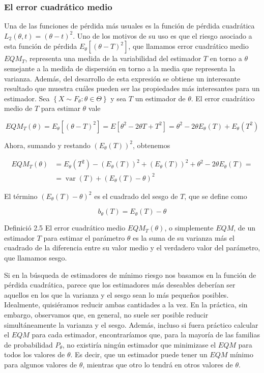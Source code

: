 \documentclass[
]{article}
\begin{document}
\subsubsection{El error cuadrático medio}\label{el-error-cuadruxe1tico-medio}

Una de las funciones de pérdida más usuales es la función de pérdida cuadrática \(L_{2}(\theta, t)=(\theta-t)^{2}\). Uno de los motivos de su uso es que el riesgo asociado a esta función de pérdida \(E_{\theta}\left[(\theta-T)^{2}\right]\), que llamamos error cuadrático medio \(E Q M_{T}\), representa una medida de la variabilidad del estimador \(T\) en torno a \(\theta\) semejante a la medida de dispersión en torno a la media que representa la varianza.
Además, del desarrollo de esta expresión se obtiene un interesante resultado que muestra cuáles pueden ser las propiedades más interesantes para un estimador.
Sea \(\left\{X \sim F_{\theta}: \theta \in \Theta\right\}\) y sea \(T\) un estimador de \(\theta\). El error cuadrático medio de \(T\) para estimar \(\theta\) vale

\[
E Q M_{T}(\theta)=E_{\theta}\left[(\theta-T)^{2}\right]=E\left[\theta^{2}-2 \theta T+T^{2}\right]=\theta^{2}-2 \theta E_{\theta}(T)+E_{\theta}\left(T^{2}\right)
\]

Ahora, sumando y restando \(\left(E_{\theta}(T)\right)^{2}\), obtenemos

\[
\begin{aligned}
E Q M_{T}(\theta) & =E_{\theta}\left(T^{2}\right)-\left(E_{\theta}(T)\right)^{2}+\left(E_{\theta}(T)\right)^{2}+\theta^{2}-2 \theta E_{\theta}(T)= \\
& =\operatorname{var}(T)+\left(E_{\theta}(T)-\theta\right)^{2}
\end{aligned}
\]

El término \(\left(E_{\theta}(T)-\theta\right)^{2}\) es el cuadrado del sesgo de \(T\), que se define como

\[
b_{\theta}(T)=E_{\theta}(T)-\theta
\]

Definició 2.5 El error cuadrático medio \(E Q M_{T}(\theta)\), o simplemente \(E Q M\), de un estimador \(T\) para estimar el parámetro \(\theta\) es la suma de su varianza más el cuadrado de la diferencia entre su valor medio y el verdadero valor del parámetro, que llamamos sesgo.

Si en la búsqueda de estimadores de mínimo riesgo nos basamos en la función de pérdida cuadrática, parece que los estimadores más deseables deberían ser aquellos en los que la varianza y el sesgo sean lo más pequeños posibles. Idealmente, quisiéramos reducir ambas cantidades a la vez. En la práctica, sin embargo, observamos que, en general, no suele ser posible reducir simultáneamente la varianza y el sesgo. Además, incluso si fuera práctico calcular el \(E Q M\) para cada estimador, encontraríamos que, para la mayoría de las familias de probabilidad \(P_{\theta}\), no existiría ningún estimador que minimizase el \(E Q M\) para todos los valores de \(\theta\). Es decir, que un estimador puede tener un \(E Q M\) mínimo para algunos valores de \(\theta\), mientras que otro lo tendrá en otros valores de \(\theta\).
\end{document}
